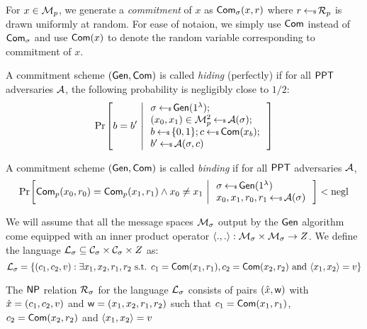 For $x\in \mathcal{M}_p$, we generate a {\em commitment} of $x$ as $\mathsf{Com}_\sigma(x,r)$ where $r\hskip2.3pt{\gets\!\!\mbox{\tiny${\$}$\normalsize}}\, \mathcal{R}_p$ is drawn uniformly at random. For ease of notaion, we simply use $\mathsf{Com}$ instead of $\mathsf{Com}_\sigma$ and use $\mathsf{Com}(x)$ to denote the random variable corresponding to commitment of $x$. 

\begin{definition}\label{defn:hidingcomm}
A commitment scheme $(\mathsf{Gen},\mathsf{Com})$ is called {\em hiding} (perfectly) if for all $\mathsf{PPT}$ adversaries $\mathcal{A}$, the following probability is negligibly close to $1/2$:
\begin{align*}
\condprob{b=b'}{
\begin{array}{l}
\sigma\sample \gen(\secparam); \\
(x_0,x_1)\in \calM^2_p\sample \adv(\sigma); \\
b\sample \bitset; c\sample \com(x_b);\\
b'\sample \adv(\sigma,c)
\end{array}
}
\end{align*}
\end{definition}

\begin{definition}\label{defn:bindingcomm}
A commitment scheme $(\mathsf{Gen},\mathsf{Com})$ is called {\em binding} if for all $\mathsf{PPT}$ adversaries $\mathcal{A}$, 
\begin{align*}
\condprob{\com_p(x_0,r_0)=\com_p(x_1,r_1)\wedge x_0\neq x_1}{
\begin{array}{l}
\sigma\sample \gen(\secparam) \\
x_0,x_1,r_0,r_1 \sample \adv(\sigma)
\end{array}
} < \negl
\end{align*}

\end{definition}

We will assume that all the message spaces $\mathcal{M}_\sigma$ output by the $\mathsf{Gen}$ algorithm come equipped with an inner product operator $\langle .,.\rangle:\mathcal{M}_\sigma\times \mathcal{M}_\sigma\rightarrow Z$. We define the language $\mathcal{L}_\sigma\subseteq \mathcal{C}_\sigma\times \mathcal{C}_\sigma\times Z$ as:
\begin{equation*}
\mathcal{L}_\sigma = \{(c_1,c_2,v):\exists x_1,x_2,r_1,r_2 \text{ s.t. }
c_1=\mathsf{Com}(x_1,r_1), c_2=\mathsf{Com}(x_2,r_2) \text{ and } \langle x_1,x_2\rangle=v\} 
\end{equation*}

The $\mathsf{NP}$ relation $\mathcal{R}_\sigma$ for the language $\mathcal{L}_\sigma$ consists of pairs $(\hat{x},\mathsf{w})$ with $\hat{x}=(c_1,c_2,v)$ and $\mathsf{w}=(x_1,x_2,r_1,r_2)$ such that $c_1=\mathsf{Com}(x_1,r_1)$, $c_2=\mathsf{Com}(x_2,r_2)$ and $\langle x_1,x_2\rangle=v$ 

